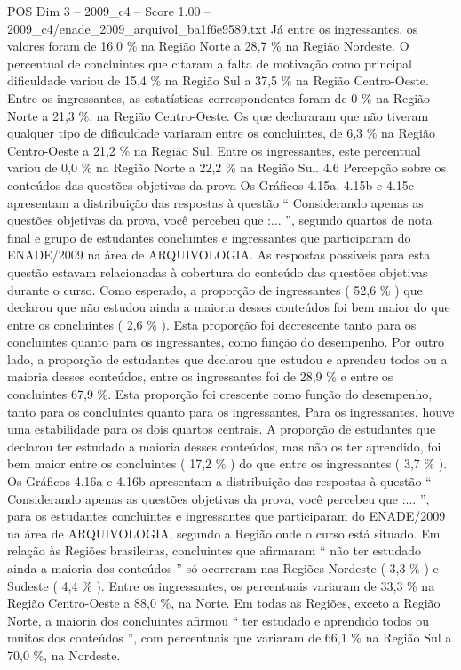 \begin{textsample}{POS Dim 3 – 2009\_c4 – Score 1.00 – 2009\_c4/enade\_2009\_arquivol\_ba1f6e9589.txt}
Já entre os ingressantes, os valores foram de 16,0 \% na Região Norte a 28,7 \% na Região Nordeste.
O percentual de concluintes que citaram a falta de motivação como principal dificuldade variou de 15,4 \% na Região Sul a 37,5 \% na Região Centro-Oeste.
Entre os ingressantes, as estatísticas correspondentes foram de 0 \% na Região Norte a 21,3 \%, na Região Centro-Oeste.
Os que declararam que não tiveram qualquer tipo de dificuldade variaram entre os concluintes, de 6,3 \% na Região Centro-Oeste a 21,2 \% na Região Sul.
Entre os ingressantes, este percentual variou de 0,0 \% na Região Norte a 22,2 \% na Região Sul. 4.6 Percepção sobre os conteúdos das questões objetivas da prova Os Gráficos 4.15a, 4.15b e 4.15c apresentam a distribuição das respostas à questão “ Considerando apenas as questões objetivas da prova, você percebeu que :... ”, segundo quartos de nota final e grupo de estudantes concluintes e ingressantes que participaram do ENADE/2009 na área de ARQUIVOLOGIA.
As respostas possíveis para esta questão estavam relacionadas à cobertura do conteúdo das questões objetivas durante o curso.
Como esperado, a proporção de ingressantes ( 52,6 \% ) que declarou que não estudou ainda a maioria desses conteúdos foi bem maior do que entre os concluintes ( 2,6 \% ).
Esta proporção foi decrescente tanto para os concluintes quanto para os ingressantes, como função do desempenho.
Por outro lado, a proporção de estudantes que declarou que estudou e aprendeu todos ou a maioria desses conteúdos, entre os ingressantes foi de 28,9 \% e entre os concluintes 67,9 \%.
Esta proporção foi crescente como função do desempenho, tanto para os concluintes quanto para os ingressantes.
Para os ingressantes, houve uma estabilidade para os dois quartos centrais.
A proporção de estudantes que declarou ter estudado a maioria desses conteúdos, mas não os ter aprendido, foi bem maior entre os concluintes ( 17,2 \% ) do que entre os ingressantes ( 3,7 \% ).
Os Gráficos 4.16a e 4.16b apresentam a distribuição das respostas à questão “ Considerando apenas as questões objetivas da prova, você percebeu que :... ”, para os estudantes concluintes e ingressantes que participaram do ENADE/2009 na área de ARQUIVOLOGIA, segundo a Região onde o curso está situado.
Em relação às Regiões brasileiras, concluintes que afirmaram “ não ter estudado ainda a maioria dos conteúdos ” só ocorreram nas Regiões Nordeste ( 3,3 \% ) e Sudeste ( 4,4 \% ).
Entre os ingressantes, os percentuais variaram de 33,3 \% na Região Centro-Oeste a 88,0 \%, na Norte.
Em todas as Regiões, exceto a Região Norte, a maioria dos concluintes afirmou “ ter estudado e aprendido todos ou muitos dos conteúdos ”, com percentuais que variaram de 66,1 \% na Região Sul a 70,0 \%, na Nordeste.

\end{textsample}

